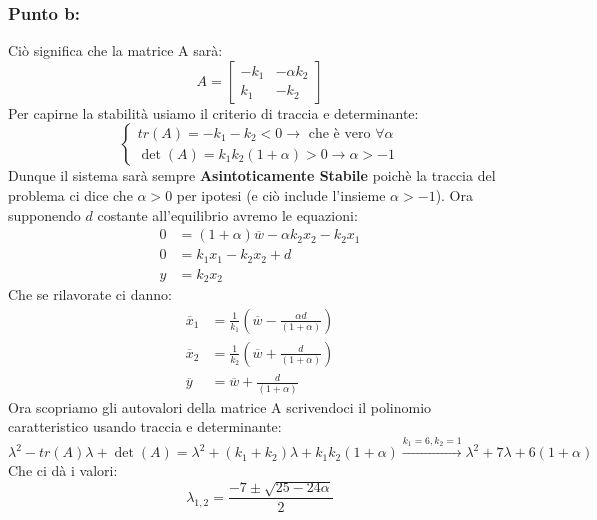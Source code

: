 \documentclass[a4paper]{report}
\begin{document}
\subsubsection*{Punto b:}
Ciò significa che la matrice A sarà:
\[
A=\begin{bmatrix}
-k_1 & -\alpha k_2\\
k_1 & -k_2
\end{bmatrix}
\]
Per capirne la stabilità usiamo il criterio di traccia e determinante:
\[
\left\{\begin{array}{l}
tr(A)=-k_1-k_2<0 \longrightarrow \text{ che è vero }\forall \alpha\\
\det(A)=k_1k_2(1+\alpha)>0\longrightarrow \alpha>-1
\end{array}\right.
\]
Dunque il sistema sarà sempre \textbf{Asintoticamente Stabile} poichè la traccia del problema ci dice che $\alpha >0$ per ipotesi (e ciò include l'insieme $\alpha > -1$). \newline
Ora supponendo $d$ costante all'equilibrio avremo le equazioni:
\begin{align*}
0&=(1+\alpha)\overline{w}-\alpha k_2x_2-k_2x_1\\
0&=k_1x_1-k_2x_2+d\\
y&=k_2x_2
\end{align*}
Che se rilavorate ci danno:
\begin{align*}
\overline{x}_1&=\frac{1}{k_1}\left(\overline{w}-\frac{\alpha d}{(1+\alpha)}\right)\\
\overline{x}_2&=\frac{1}{k_2}\left(\overline{w}+\frac{d}{(1+\alpha)}\right)\\
\overline{y}&=\overline{w}+\frac{d}{(1+\alpha)}
\end{align*}
Ora scopriamo gli autovalori della matrice A scrivendoci il polinomio caratteristico usando traccia e determinante:
\[
\lambda^2-tr(A)\lambda+\det(A)=\lambda^2+(k_1+k_2)\lambda+k_1k_2(1+\alpha)\overset{k_1=6, k_2=1}{\longrightarrow}\lambda^2+7\lambda+6(1+\alpha)
\]
Che ci dà i valori:
\[
\lambda_{1,2}=\frac{-7\pm\sqrt{25-24\alpha}}{2}
\]
\end{document}
